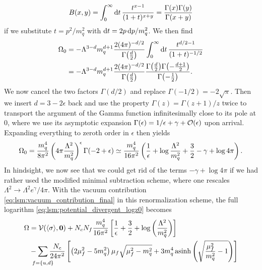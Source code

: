 \begin{equation}
	B(x,y) = \int_0^\infty \mathop{}\!\mathrm{d} t \, \frac{t^{x-1}}{(1+t)^{x+y}} = \frac{\Gamma(x) \Gamma(y)}{\Gamma(x+y)}
\end{equation}
if we substitute $t = p^2/m_q^2$ with $\mathop{}\!\mathrm{d} t = 2 p \mathop{}\!\mathrm{d} p / m_q^2$.
We then find
\begin{equation}
\begin{split}
	\Omega_0 &= -\Lambda^{3-d} m_q^{d+1} \frac{2 (4 \pi)^{-d/2}}{\Gamma\big(\frac{d}{2}\big)} \int_0^\infty \mathop{}\!\mathrm{d} t \, \frac{t^{d/2-1}}{(1+t)^{-1/2}} \\
	         &= -\Lambda^{3-d} m_q^{d+1} \frac{2 (4 \pi)^{-d/2}}{\Gamma\big(\frac{d}{2}\big)} \frac{\Gamma\big(\frac{d}{2}\big) \Gamma\big( \textstyle{-\frac{d+1}{2}} \big)}{\Gamma\big( \textstyle{-\frac{1}{2}} \big)} .
\end{split}
\end{equation}
We now cancel the two factors $\Gamma(d/2)$ and replace $\Gamma(-1/2) = -2\sqrt{\pi}$.
Then we insert $d = 3 - 2 \epsilon$ back and use the property $\Gamma(z) = \Gamma(z+1) / z$ twice to transport the argument of the Gamma function infinitesimally close to its pole at $0$,
where we use its asymptotic expansion $\Gamma(\epsilon) = 1/\epsilon + \gamma + \mathcal{O}(\epsilon)$ upon arrival.
Expanding everything to zeroth order in $\epsilon$ then yields
\begin{equation}
	\Omega_0 =       \frac{m_q^4}{8 \pi^2} \left( 4 \pi \frac{\Lambda^2}{m_q^2} \right)^\epsilon \Gamma(-2 + \epsilon)
	         \simeq \frac{m_q^4}{16 \pi^2} \left( \frac{1}{\epsilon} + \log \frac{\Lambda^2}{m_q^2} + \frac32 - \gamma + \log 4 \pi \right) .
\label{eq:lsm:vacuum_contribution_final}
\end{equation}
In hindsight, we now see that we could get rid of the terms $-\gamma + \log 4 \pi$ if we had rather used the modified minimal subtraction scheme, where one rescales $\Lambda^2 \rightarrow \Lambda^2 e^\gamma / 4 \pi$.
With the vacuum contribution \eqref{eq:lsm:vacuum_contribution_final} in this renormalization scheme, the full logarithm \eqref{eq:lsm:potential_divergent_logz0} becomes
\begin{equation}
\begin{split}
	\Omega &= \pot(\avg{\sigma},\vec{0}) + N_c N_f \frac{m_q^4}{16 \pi^2} \left[ \frac{1}{\epsilon} + \frac{3}{2} + \log\left(\frac{{\Lambda}^2}{m_q^2}\right) \right] \\
	       &- \smashoperator{\sum_{\vphantom{\big|} f=\{u,d\}}} \frac{N_c}{24 \pi^2} \left[ \left( 2 \mu_f^2 - 5 m_q^2 \right) \mu_f \sqrt{\mu_f^2 - m_q^2} + 3 m_q^4 \asinh \left( \sqrt{\frac{\mu_{\smash{f}}^2}{m_q^2}-1} \right) \right]
\end{split}
\end{equation}
